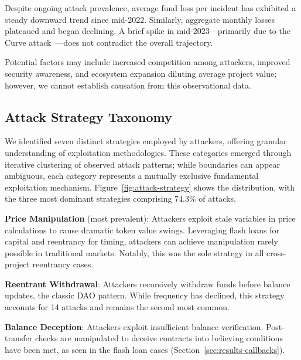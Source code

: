 Despite ongoing attack prevalence, average fund loss per incident has exhibited a steady downward trend since mid-2022. Similarly, aggregate monthly losses plateaued and began declining. A brief spike in mid-2023---primarily due to the Curve attack~\cite{attack-report:curve}---does not contradict the overall trajectory.

Potential factors may include increased competition among attackers, improved security awareness, and ecosystem expansion diluting average project value; however, we cannot establish causation from this observational data.



\subsection{Attack Strategy Taxonomy}
\label{sec:results-strategy}

We identified seven distinct strategies employed by attackers, offering granular understanding of exploitation methodologies. These categories emerged through iterative clustering of observed attack patterns; while boundaries can appear ambiguous, each category represents a mutually exclusive fundamental exploitation mechanism. Figure~\ref{fig:attack-strategy} shows the distribution, with the three most dominant strategies comprising 74.3\% of attacks.


\textbf{Price Manipulation} (most prevalent): Attackers exploit stale variables in price calculations to cause dramatic token value swings. Leveraging flash loans for capital and reentrancy for timing, attackers can achieve manipulation rarely possible in traditional markets. Notably, this was the sole strategy in all cross-project reentrancy cases.

\textbf{Reentrant Withdrawal}: Attackers recursively withdraw funds before balance updates, the classic DAO pattern. While frequency has declined, this strategy accounts for 14 attacks and remains the second most common.

\textbf{Balance Deception}: Attackers exploit insufficient balance verification. Post-transfer checks are manipulated to deceive contracts into believing conditions have been met, as seen in the flash loan cases (Section~\ref{sec:results-callbacks}).

